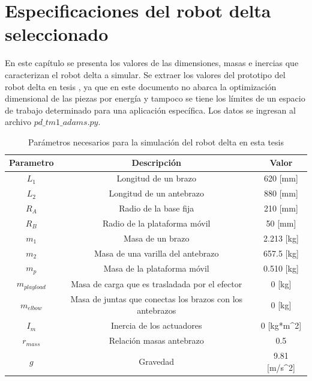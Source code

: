 \chapter{Especificaciones del robot delta seleccionado}\label{CAP5}
En este capítulo se presenta los valores de las dimensiones, masas e inercias que caracterizan el robot delta a simular. Se extraer los valores del prototipo del robot delta en tesis \cite{upm378}, ya que en este documento no abarca la optimización dimensional de las piezas por energía y tampoco se tiene los límites de un espacio de trabajo determinado para una aplicación específica. Los datos se ingresan al archivo $pd\_tm1\_adams.py$.


    \begingroup
        \renewcommand{\arraystretch}{1.5}
        \begin{table}[H]
        \centering
        \begin{tabular}{c c{4cm} c}
           \hline
           \textbf{Parametro}  & \multicolumn{1}{c}{\textbf{Descripción}} & Valor \\\hline\hline
            $L_1$  & Longitud de un brazo           & 620 [mm]                        \\\hline
            $L_2$  & Longitud de un antebrazo       & 880 [mm]                         \\\hline
            $R_A$  & Radio de la base fija           & 210 [mm]                         \\\hline
            $R_B$  & Radio de la plataforma móvil    & 50 [mm]                         \\\hline
            $m_1$  & Masa de un brazo                & 2.213 [kg]                         \\\hline
            $m_2$  & Masa de una varilla del antebrazo  & 657.5 [kg]                         \\\hline
            $m_p$  & Masa de la plataforma móvil     & 0.510 [kg]                         \\\hline
            $m_{playload}$  & Masa de carga que es trasladada por el efector & 0 [kg]           \\\hline
            $m_{elbow}$  & Masa de juntas que conectas los brazos con los antebrazos  & 0 [kg]  \\\hline
            $I_m$  & Inercia de los actuadores           &   0 [kg*m^2]     \\\hline
            $r_{mass}$  & Relación masas antebrazo           & 0.5        \\\hline
            $g$  & Gravedad           & 9.81  [m/s^2]                      \\\hline 
        \end{tabular}
        \caption{Parámetros necesarios para la simulación del robot delta en esta tesis}
        \label{tab:cap5_tabla_1}
    \end{table}
    \endgroup
    
